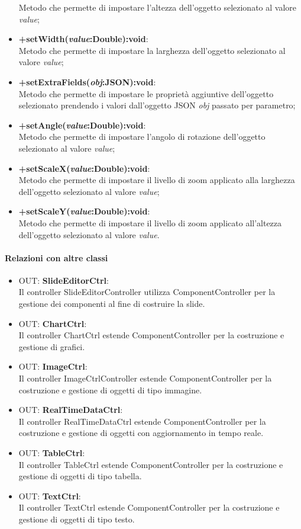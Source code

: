 \begin{itemize}
		Metodo che permette di impostare l'altezza dell'oggetto selezionato al valore \textit{value};
	\item \textbf{+setWidth(\textit{value}:Double):void}:\\
		Metodo che permette di impostare la larghezza dell'oggetto selezionato al valore \textit{value};
	\item \textbf{+setExtraFields(\textit{obj}:JSON):void}:\\
		Metodo che permette di impostare le proprietà aggiuntive dell'oggetto selezionato prendendo i valori dall'oggetto JSON \textit{obj} passato per parametro;
	\item \textbf{+setAngle(\textit{value}:Double):void}:\\
		Metodo che permette di impostare l'angolo di rotazione dell'oggetto selezionato al valore \textit{value};
	\item \textbf{+setScaleX(\textit{value}:Double):void}:\\
		Metodo che permette di impostare il livello di zoom applicato alla larghezza dell'oggetto selezionato al valore \textit{value};
	\item \textbf{+setScaleY(\textit{value}:Double):void}:\\
		Metodo che permette di impostare il livello di zoom applicato all'altezza dell'oggetto selezionato al valore \textit{value}.
	\end{itemize}
	\paragraph{Relazioni con altre classi}
	\begin{itemize}
	 \item OUT: \textbf{SlideEditorCtrl}:\\
		Il controller SlideEditorController utilizza ComponentController per la gestione dei componenti al fine di costruire la slide.
	 \item OUT: \textbf{ChartCtrl}:\\
	 	Il controller ChartCtrl estende ComponentController per la costruzione e gestione di grafici.
	 \item OUT: \textbf{ImageCtrl}:\\
		Il controller ImageCtrlController estende ComponentController per la costruzione e gestione di oggetti di tipo immagine.
	 \item OUT: \textbf{RealTimeDataCtrl}:\\
		Il controller RealTimeDataCtrl estende ComponentController per la costruzione e gestione di oggetti con aggiornamento in tempo reale.
	 \item OUT: \textbf{TableCtrl}:\\
		Il controller TableCtrl estende ComponentController per la costruzione e gestione di oggetti di tipo tabella.
	 \item OUT: \textbf{TextCtrl}:\\
		Il controller TextCtrl estende ComponentController per la costruzione e gestione di oggetti di tipo testo.
	
	\end{itemize}

